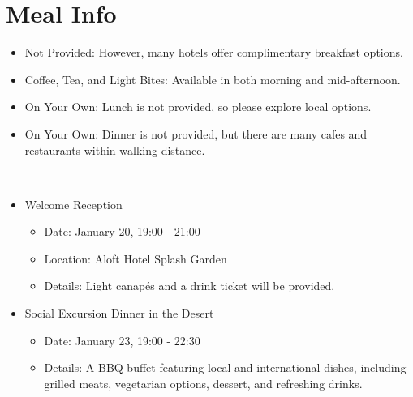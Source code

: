 \chapter{Meal Info}
\vspace*{-0.2cm}
\begin{itemize}[noitemsep]
    \item Not Provided: However, many hotels offer complimentary breakfast options.
\end{itemize}

\vspace*{-0.2cm}
\begin{itemize}[noitemsep]
    \item Coffee, Tea, and Light Bites: Available in both morning and mid-afternoon.
\end{itemize}

\vspace*{-0.2cm}
\begin{itemize}[noitemsep]
    \item On Your Own: Lunch is not provided, so please explore local options.
\end{itemize}

\vspace*{-0.2cm}
\begin{itemize}[noitemsep]
    \item On Your Own: Dinner is not provided, but there are many cafes and restaurants within walking distance.
\end{itemize}

\noindent\hrulefill \\
\vspace*{-0.2cm}
\begin{itemize}[noitemsep]
\item Welcome Reception
\begin{itemize}[noitemsep]
\item Date: January 20, 19:00 - 21:00
\item Location: Aloft Hotel Splash Garden
\item Details: Light canapés and a drink ticket will be provided.
\end{itemize}

\item Social Excursion Dinner in the Desert
\begin{itemize}[noitemsep]
\item Date: January 23, 19:00 - 22:30
\item Details: A BBQ buffet featuring local and international dishes, including grilled meats, vegetarian options, dessert, and refreshing drinks.
\end{itemize}
\end{itemize}
